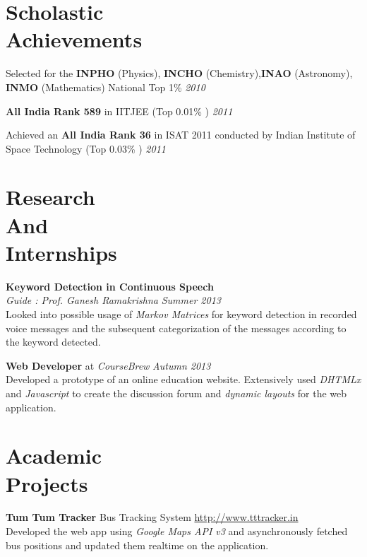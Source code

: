 \documentclass[margin,10pt]{resume}
\begin{document}
\begin{resume}

\vspace{15mm}

\section{\mysidestyle Scholastic\\Achievements}

\begin{list2}
\item Selected for the \textbf{INPHO} (Physics), \textbf{INCHO} (Chemistry),\textbf{INAO} (Astronomy), \textbf{ INMO} (Mathematics) National Top 1\% \hfill \emph{2010}
\item \textbf{All India Rank 589} in IITJEE (Top 0.01\% ) \hfill \emph{2011}
\item Achieved an \textbf{All India Rank 36} in ISAT 2011 conducted by Indian Institute of Space Technology (Top 0.03\% )
\hfill \emph{2011}
\end{list2}
\section{\mysidestyle Research\\And\\Internships }
\textbf{Keyword Detection in Continuous Speech} \\
    \textsl{Guide : Prof. Ganesh Ramakrishna} \hfill \emph{Summer 2013} \\
     Looked into possible usage of \emph{Markov Matrices} for keyword detection in recorded voice messages and the subsequent categorization of the messages according to the keyword detected.

\textbf{Web Developer} at \emph{CourseBrew} \hfill \emph{Autumn 2013} \\
Developed a prototype of an online education website. Extensively used \emph{DHTMLx} and \emph{Javascript} to create the discussion forum and \emph{dynamic layouts} for the web application.

\section{\mysidestyle Academic\\Projects}

\textbf{Tum Tum Tracker} \hfill Bus Tracking System \hfill
    \url{http://www.tttracker.in} \\
 Developed the web app using \emph{Google Maps API v3} and asynchronously fetched bus positions and updated them realtime  on the application.


\end{resume}
\end{document}
